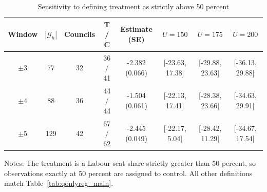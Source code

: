 \begin{table}[!h]
\centering
\begin{threeparttable}
\caption{Sensitivity to defining treatment as strictly above 50 percent}
\label{tab:qonlyreg_strict_majority}
\small
\begin{tabular}{cccccccc}
\toprule
Window & $|\mathcal G_h|$ & Councils & T / C & Estimate (SE) & $U=150$ & $U=175$ & $U=200$ \\
\midrule
$\pm 3$ & 77 & 32 & 36 / 41 & -2.382 (0.066) & [-23.63, 17.38] & [-29.88, 23.63] & [-36.13, 29.88] \\
$\pm 4$ & 88 & 36 & 44 / 44 & -1.504 (0.061) & [-22.13, 17.41] & [-28.38, 23.66] & [-34.63, 29.91] \\
$\pm 5$ & 129 & 42 & 67 / 62 & -2.445 (0.049) & [-22.17, 5.04] & [-28.42, 11.29] & [-34.67, 17.54] \\
\bottomrule
\end{tabular}
\begin{tablenotes}[flushleft]
\footnotesize
\item Notes: The treatment is a Labour seat share strictly greater than 50 percent, so observations exactly at 50 percent are assigned to control. All other definitions match Table~\ref{tab:qonlyreg_main}.
\end{tablenotes}
\end{threeparttable}
\end{table}
